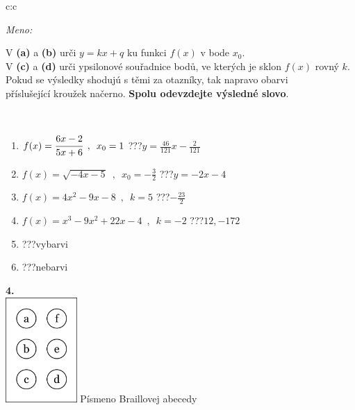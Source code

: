 \documentclass[10pt]{report}
\begin{document}
\begin{tabular}{c:c}
\begin{minipage}[c][104.5mm][t]{0.5\linewidth}
\begin{center}
\textit{Meno:}\phantom{xxxxxxxxxxxxxxxxxxxxxxxxxxxxxxxxxxxxxxxxxxxxxxxxxxxxxxxxxxxxxxxxx}\\[5mm]
\begin{minipage}{0.95\linewidth}
\begin{center}
V \textbf{(a)} a \textbf{(b)} urči  $y = kx + q$ ku funkci $f(x)$ v bode $x_0$.\\V \textbf{(c)} a \textbf{(d)} urči ypsilonové souřadnice bodů, ve kterých je sklon $f(x)$ rovný $k$.\\Pokud se výsledky shodujú s těmi za otazníky, tak napravo obarvi\\příslušející kroužek načerno. \textbf{Spolu odevzdejte výsledné slovo}.
\end{center}
\end{minipage}
\\[1mm]
\begin{minipage}{0.79\linewidth}
\begin{center}
\begin{varwidth}{\linewidth}
\begin{enumerate}
\small
\item $f(x)=\cfrac{6x-2}{5x+6}\enspace , \enspace x_0=1$\quad \dotfill\; ???\;\dotfill \quad $y = \frac{46}{121}x-\frac{2}{121}$
\item $f(x)=\sqrt{-4x-5}\enspace , \enspace x_0=-\frac{3}{2}$\quad \dotfill\; ???\;\dotfill \quad $y = -2x-4$
\item $f(x)=4x^2-9x-8\enspace , \enspace k=5$\quad \dotfill\; ???\;\dotfill \quad $-\frac{23}{2}$
\item $f(x)=x^3-9x^2+22x-4\enspace , \enspace k=-2$\quad \dotfill\; ???\;\dotfill \quad $12 , -172$
\item \quad \dotfill\; ???\;\dotfill \quad vybarvi
\item \quad \dotfill\; ???\;\dotfill \quad nebarvi
\end{enumerate}
\end{varwidth}
\end{center}
\end{minipage}
\begin{minipage}{0.20\linewidth}
\begin{center}
{\Huge\bfseries 4.} \\[2mm]
\includegraphics[height=40mm]{../images/braille.png}
{\small Písmeno Braillovej abecedy}
\end{center}
\end{minipage}
\end{center}
\end{minipage}
%
\end{tabular}
\end{document}
